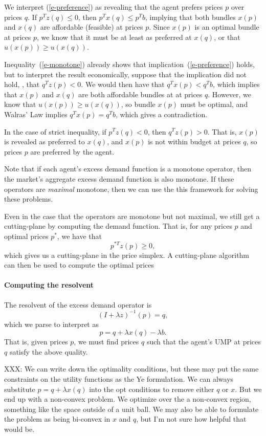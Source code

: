 \documentclass[12pt]{article}
\begin{document}
We interpret (\ref{e-preference}) as revealing that the agent prefers prices
$p$ over prices $q$. If $p^T z(q) \leq 0$, then $p^T x(q) \leq p^T b$, implying
that both bundles $x(p)$ and $x(q)$ are affordable (feasible) at prices $p$.
Since $x(p)$ is an optimal bundle at prices $p$, we know that it must be at least
as preferred at $x(q)$, or that $u(x(p)) \geq u(x(q))$.

Inequality~(\ref{e-monotone}) already shows that implication~(\ref{e-preference})
holds, but to interpret the result economically, suppose that the
implication did not hold, \ie, that $q^T z(p) < 0$. We would then have that
$q^T x(p) < q^T b$, which implies that $x(p)$ and $x(q)$ are both affordable
bundles at at prices $q$. However, we know that $u(x(p)) \geq u(x(q))$, so
bundle $x(p)$ must be optimal, and Walras' Law implies $q^T x(p) = q^T b$, which
gives a contradiction. 

In the case of strict inequality, if $p^T z(q) < 0$, then $q^T z(p) > 0$.
That is, $x(p)$ is revealed as preferred to $x(q)$, and $x(p)$ is not within
budget at prices $q$, so prices $p$ are preferred by the agent.

Note that if each agent's excess demand function is a monotone operator, then
the market's aggregate excess demand function is also monotone. If these
operators are \emph{maximal} monotone, then we can use the this framework for
solving these problems.

Even in the case that the operators are monotone but not maximal, we still get
a cutting-plane by computing the demand function. That is, for any prices $p$
and optimal prices $p^*$, we have that
\[
p^{*T} z(p) \geq 0,
\]
which gives us a cutting-plane in the price simplex.
A cutting-plane algorithm can then be used to compute the optimal prices

\paragraph{Computing the resolvent}
The resolvent of the excess demand operator is
\[
(I + \lambda z)^{-1}(p) = q,
\]
which we parse to interpret as
\[
p = q + \lambda x(q) - \lambda b.
\]
That is, given prices $p$, we must find prices $q$ such that the agent's UMP
at prices $q$ satisfy the above quality.

XXX: We can write down the optimality conditions, but these may put the same
constraints on the utility functions as the Ye formulation. We can always
substitute $p = q + \lambda x(q)$ into the opt conditions to remove either
$q$ or $x$. But we end up with a non-convex problem. We optimize over the a
non-convex region, something like the space outside of a unit ball.
We may also be able to formulate the problem as being bi-convex in $x$ and $q$,
but I'm not sure how helpful that would be.
\end{document}
